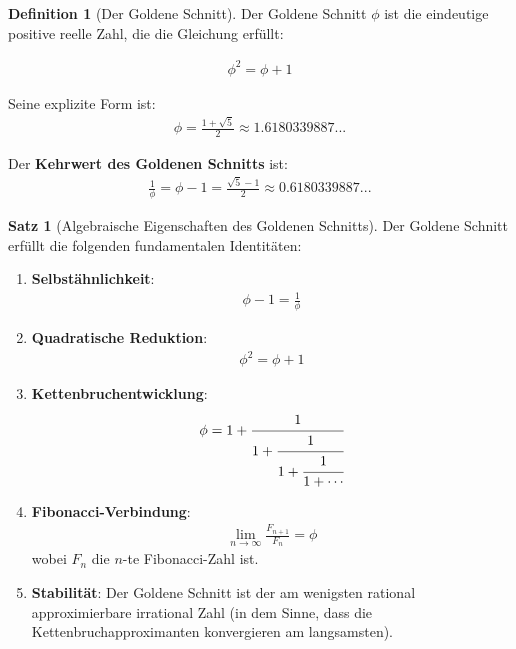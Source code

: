 \documentclass[a4paper,12pt,twoside]{report}
\theoremstyle{definition}
\newtheorem{definition}{Definition}
\newtheorem{satz}{Satz}
\begin{document}
\begin{definition}[Der Goldene Schnitt]
Der Goldene Schnitt $\phi$ ist die eindeutige positive reelle Zahl, die die Gleichung erfüllt:

\begin{align}
\phi^2 = \phi + 1
\end{align}

Seine explizite Form ist:
\begin{align}
\phi = \frac{1 + \sqrt{5}}{2} \approx 1.6180339887...
\end{align}

Der \textbf{Kehrwert des Goldenen Schnitts} ist:
\begin{align}
\frac{1}{\phi} = \phi - 1 = \frac{\sqrt{5} - 1}{2} \approx 0.6180339887...
\end{align}
\end{definition}

\begin{satz}[Algebraische Eigenschaften des Goldenen Schnitts]
Der Goldene Schnitt erfüllt die folgenden fundamentalen Identitäten:

\begin{enumerate}
	\item \textbf{Selbstähnlichkeit}: 
	\begin{align}
	\phi - 1 = \frac{1}{\phi}
	\end{align}
	
	\item \textbf{Quadratische Reduktion}: 
	\begin{align}
	\phi^2 = \phi + 1
	\end{align}
	
	\item \textbf{Kettenbruchentwicklung}: 
	\begin{align}
	\phi = 1 + \cfrac{1}{1 + \cfrac{1}{1 + \cfrac{1}{1 + \cdots}}}
	\end{align}
	
	\item \textbf{Fibonacci-Verbindung}: 
	\begin{align}
	\lim_{n \to \infty} \frac{F_{n+1}}{F_n} = \phi
	\end{align}
	wobei $F_n$ die $n$-te Fibonacci-Zahl ist.
	
	\item \textbf{Stabilität}: Der Goldene Schnitt ist der am wenigsten rational approximierbare irrational Zahl (in dem Sinne, dass die Kettenbruchapproximanten konvergieren am langsamsten).
\end{enumerate}
\end{satz}
\end{document}
